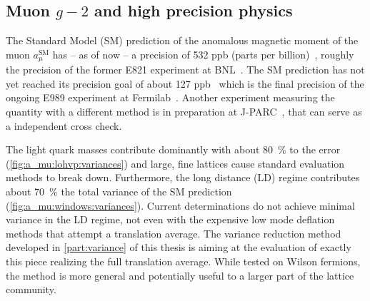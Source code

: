 

\subsection{Muon $g-2$ and high precision physics}


The Standard Model (SM) prediction of the anomalous magnetic moment of the muon $a_{\mu}^{\text{SM}}$ has -- as of now -- a precision of \num{532} ppb (parts per billion)~\cite{snowmass:2025}, roughly the precision of the former E821 experiment at BNL~\cite{PhysRevD.73.072003}.
The SM prediction has not yet reached its precision goal of about \num{127} ppb~\cite{online:gm2} which is the final precision of the ongoing E989 experiment at Fermilab~\cite{Muong-2:2025xyk}.
Another experiment measuring the quantity with a different method is in preparation at J-PARC~\cite{10.1093/ptep/ptz030}, that can serve as a independent cross check.


The light quark masses contribute dominantly with about \SI{80}{\percent} to the error (\cref{fig:a_mu:lohvp:variances}) and large, fine lattices cause standard evaluation methods to break down.
Furthermore, the long distance (LD) regime contributes about \SI{70}{\percent} the total variance of the SM prediction (\cref{fig:a_mu:windows:variances}).
Current determinations do not achieve minimal variance in the LD regime, not even with the expensive low mode deflation methods that attempt a translation average.
The variance reduction method developed in \cref{part:variance} of this thesis is aiming at the evaluation of exactly this piece realizing the full translation average.
While tested on Wilson fermions, the method is more general and potentially useful to a larger part of the lattice community.

